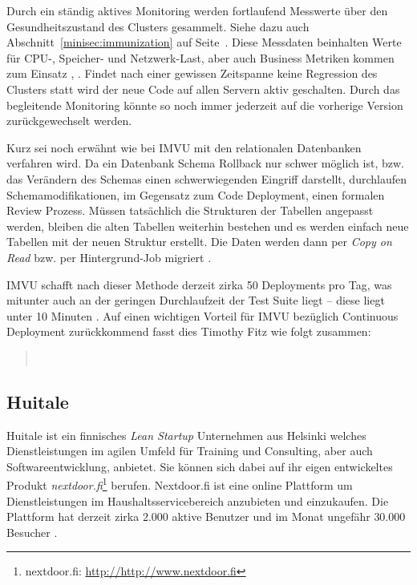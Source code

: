 Durch ein ständig aktives Monitoring werden fortlaufend Messwerte über den
Gesundheitszustand des Clusters gesammelt. Siehe dazu auch
Abschnitt~\ref{minisec:immunization} auf Seite~\pageref{minisec:immunization}.
Diese Messdaten beinhalten Werte für CPU-, Speicher- und Netzwerk-Last, aber
auch Business Metriken kommen zum Einsatz \cite{Fitz2009-02-10},
\cite{imvu09}. Findet nach einer gewissen Zeitspanne keine Regression des
Clusters statt wird der neue Code auf allen Servern aktiv geschalten. Durch
das begleitende Monitoring könnte so noch immer jederzeit auf die vorherige
Version zurückgewechselt werden.

Kurz sei noch erwähnt wie bei IMVU mit den relationalen Datenbanken verfahren
wird. Da ein Datenbank Schema Rollback nur schwer möglich ist, bzw. das
Verändern des Schemas einen schwerwiegenden Eingriff darstellt, durchlaufen
Schemamodifikationen, im Gegensatz zum Code Deployment, einen formalen Review
Prozess. Müssen tatsächlich die Strukturen der Tabellen angepasst werden,
bleiben die alten Tabellen weiterhin bestehen und es werden einfach neue
Tabellen mit der neuen Struktur erstellt. Die Daten werden dann per \emph{Copy
on Read} bzw. per Hintergrund-Job migriert \cite{imvu10}.

IMVU schafft nach dieser Methode derzeit zirka 50 Deployments pro Tag, was
mitunter auch an der geringen Durchlaufzeit der Test Suite liegt -- diese
liegt unter 10 Minuten \cite{Fitz2009-02-10}. Auf einen wichtigen
Vorteil für IMVU bezüglich Continuous Deployment zurückkommend fasst dies
Timothy Fitz wie folgt zusammen:

\begin{quote}
~\cite{Fitz2009-02-08}
\end{quote}


\subsection{Huitale}

Huitale ist ein finnisches \emph{Lean Startup} Unternehmen aus Helsinki
welches Dienstleistungen im agilen Umfeld für Training und Consulting, aber
auch Softwareentwicklung, anbietet. Sie können sich dabei auf ihr eigen
entwickeltes Produkt \emph{nextdoor.fi}\footnote{nextdoor.fi:
\url{http://http://www.nextdoor.fi}} berufen. Nextdoor.fi ist eine online
Plattform um Dienstleistungen im Haushaltsservicebereich anzubieten und
einzukaufen. Die Plattform hat derzeit zirka $2.000$ aktive Benutzer und im
Monat ungefähr $30.000$ Besucher \cite{Taipale2010}.

